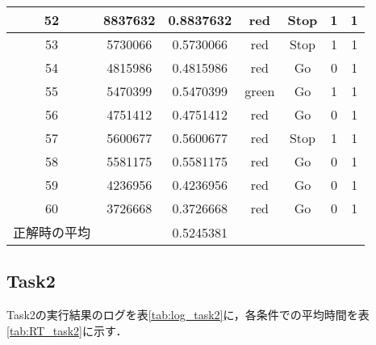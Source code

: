 \documentclass{jlreq}
\numberwithin{equation}{section}
\begin{document}
\begin{table}[H]
{\begin{tabular}{|c|c|c|c|c|c|c|}
      52           & 8837632          & 0.8837632      & red   & Stop & 1     & 1   \\ \hline
      53           & 5730066          & 0.5730066      & red   & Stop & 1     & 1   \\ \hline
      54           & 4815986          & 0.4815986      & red   & Go   & 0     & 1   \\ \hline
      55           & 5470399          & 0.5470399      & green & Go   & 1     & 1   \\ \hline
      56           & 4751412          & 0.4751412      & red   & Go   & 0     & 1   \\ \hline
      57           & 5600677          & 0.5600677      & red   & Stop & 1     & 1   \\ \hline
      58           & 5581175          & 0.5581175      & red   & Go   & 0     & 1   \\ \hline
      59           & 4236956          & 0.4236956      & red   & Go   & 0     & 1   \\ \hline
      60           & 3726668          & 0.3726668      & red   & Go   & 0     & 1   \\ \hline
      正解時の平均 & ~                & 0.5245381      & ~     & ~    & ~     & ~   \\ \hline
    \end{tabular}}
  \label{tab:log_task1}
\end{table}

\begin{table}[H]
  \centering
  \caption{Task1における，条件毎の平均反応時間}
  \label{tab:RT_task1}
\end{table}

\subsection{Task2}

Task2の実行結果のログを表\ref{tab:log_task2}に，各条件での平均時間を表\ref{tab:RT_task2}に示す．
\end{document}
